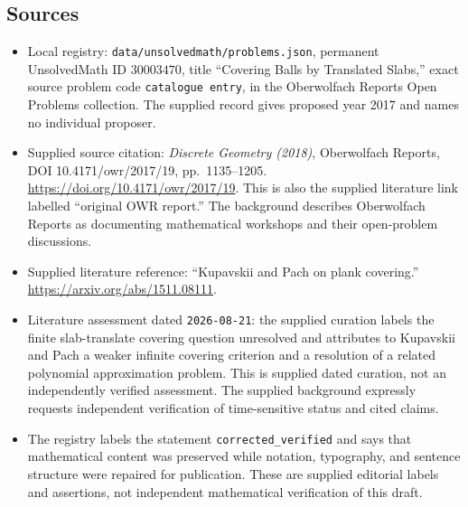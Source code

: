 \documentclass[11pt]{article}
\begin{document}
\subsection{Sources}
\begin{itemize}
\item Local registry: \texttt{data/unsolvedmath/problems.json}, permanent UnsolvedMath ID \(30003470\), title ``Covering Balls by Translated Slabs,'' exact source problem code \texttt{catalogue entry}, in the Oberwolfach Reports Open Problems collection. The supplied record gives proposed year 2017 and names no individual proposer.
\item Supplied source citation: \emph{Discrete Geometry (2018)}, Oberwolfach Reports, DOI 10.4171/owr/2017/19, pp.\ 1135--1205. \url{https://doi.org/10.4171/owr/2017/19}. This is also the supplied literature link labelled ``original OWR report.'' The background describes Oberwolfach Reports as documenting mathematical workshops and their open-problem discussions.
\item Supplied literature reference: ``Kupavskii and Pach on plank covering.'' \url{https://arxiv.org/abs/1511.08111}.
\item Literature assessment dated \texttt{2026-08-21}: the supplied curation labels the finite slab-translate covering question unresolved and attributes to Kupavskii and Pach a weaker infinite covering criterion and a resolution of a related polynomial approximation problem. This is supplied dated curation, not an independently verified assessment. The supplied background expressly requests independent verification of time-sensitive status and cited claims.
\item The registry labels the statement \texttt{corrected\_verified} and says that mathematical content was preserved while notation, typography, and sentence structure were repaired for publication. These are supplied editorial labels and assertions, not independent mathematical verification of this draft.
\end{itemize}
\end{document}
